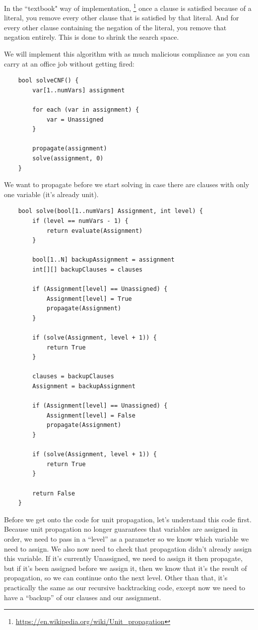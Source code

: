 \documentclass[oneside]{book}
\begin{document}
In the ``textbook" way of implementation,
\footnote{\url{https://en.wikipedia.org/wiki/Unit_propagation}} 
once a clause is satisfied because of a literal, you remove every other
clause that is satisfied by that literal. And for every other clause containing 
the negation of the literal, you remove that negation entirely. This is done to shrink the 
search space.

We will implement this algorithm with as much malicious compliance as you can 
carry at an office job without getting fired:

\begin{lstlisting}
    bool solveCNF() {
        var[1..numVars] assignment

        for each (var in assignment) {
            var = Unassigned
        }

        propagate(assignment)
        solve(assignment, 0)
    }
\end{lstlisting}

We want to propagate before we start solving in case there are clauses with 
only one variable (it's already unit).

\begin{lstlisting}
    bool solve(bool[1..numVars] Assignment, int level) {
        if (level == numVars - 1) {
            return evaluate(Assignment)
        }

        bool[1..N] backupAssignment = assignment
        int[][] backupClauses = clauses

        if (Assignment[level] == Unassigned) {
            Assignment[level] = True
            propagate(Assignment)
        }

        if (solve(Assignment, level + 1)) {
            return True
        }

        clauses = backupClauses
        Assignment = backupAssignment

        if (Assignment[level] == Unassigned) {
            Assignment[level] = False
            propagate(Assignment)
        }

        if (solve(Assignment, level + 1)) {
            return True
        }

        return False
    }
\end{lstlisting}

Before we get onto the code for unit propagation, let's understand this code first. 
Because unit propagation no longer guarantees that variables are assigned in order, 
we need to pass in a ``level'' as a parameter so we know which variable we need to 
assign. We also now need to check that propagation didn't already assign this variable. 
If it's currently Unassigned, we need to assign it then propagate, but if it's been 
assigned before we assign it, then we know that it's the result of propagation, so we 
can continue onto the next level. Other than that, it's practically the same as our recursive 
backtracking code, except now we need to have a ``backup'' of our clauses and our assignment. 
\end{document}

